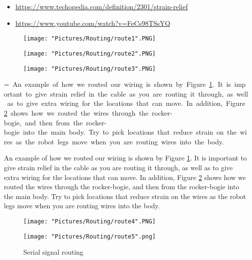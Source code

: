 \documentclass[12pt]{article}
\makeatletter
\newcommand{\mybox}[1]{%
  \setbox0=\hbox{#1}%
  \setlength{\@tempdima}{\dimexpr\wd0+13pt}%
  \begin{tcolorbox}[colframe=mycolor,boxrule=0.5pt,arc=4pt,
      left=6pt,right=6pt,top=6pt,bottom=6pt,boxsep=0pt,width=0.95\textwidth]
    #1
  \end{tcolorbox}
}
\makeatother
\begin{document}
\begin{itemize}
	\item \href{https://www.techopedia.com/definition/2301/strain-relief}{https://www.techopedia.com/definition/2301/strain-relief}
	\item \href{https://www.youtube.com/watch?v=FeCs98TSsYQ}{https://www.youtube.com/watch?v=FeCs98TSsYQ}
\end{itemize}



\begin{figure}[H]
  	\centering
  	\begin{minipage}[b]{0.34\textwidth}
    		\texttt{[image: "Pictures/Routing/route1".PNG]}
  	\end{minipage}
  	\hfill
  	\begin{minipage}[b]{0.29\textwidth}
    		\texttt{[image: "Pictures/Routing/route2".PNG]}
  	\end{minipage}
    	\hfill
  	\begin{minipage}[b]{0.30\textwidth}
    		\texttt{[image: "Pictures/Routing/route3".PNG]}
  	\end{minipage}
  	\caption{}
	\label{wiring1}
\end{figure}


\mybox{
An example of how we routed our wiring is shown by Figure \ref{wiring1}. It is important to give strain relief in the cable as you are routing it through, as well as to give extra wiring for the locations that can move. In addition, Figure \ref{wiring2} shows how we routed the wires through the rocker-bogie, and then from the rocker-bogie into the main body. Try to pick locations that reduce strain on the wires as the robot legs move when you are routing wires into the body.
}

\begin{figure}[H]
 	\centering
  	\begin{minipage}[b]{0.48\textwidth}
		\texttt{[image: "Pictures/Routing/route4".PNG]}
  	\end{minipage}
  	\hfill
  	\begin{minipage}[b]{0.42\textwidth}
    		\texttt{[image: "Pictures/Routing/route5".png]}
  	\end{minipage}
	\caption{Serial signal routing}
	\label{wiring2}
\end{figure}
\end{document}
